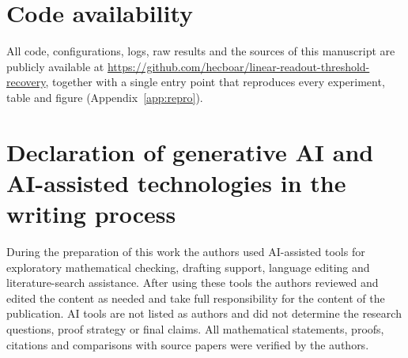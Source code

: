 \section*{Code availability}
All code, configurations, logs, raw results and the sources of this manuscript are publicly
available at \url{https://github.com/hecboar/linear-readout-threshold-recovery}, together with
a single entry point that reproduces every experiment, table and figure
(Appendix~\ref{app:repro}).

\section*{Declaration of generative AI and AI-assisted technologies in the writing process}
During the preparation of this work the authors used AI-assisted tools for exploratory
mathematical checking, drafting support, language editing and literature-search assistance.
After using these tools the authors reviewed and edited the content as needed and take full
responsibility for the content of the publication. AI tools are not listed as authors and did
not determine the research questions, proof strategy or final claims. All mathematical
statements, proofs, citations and comparisons with source papers were verified by the authors.

